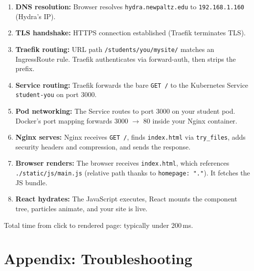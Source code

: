 \documentclass[11pt, letterpaper]{article}
\begin{document}
\begin{enumerate}
  \item \textbf{DNS resolution:} Browser resolves \texttt{hydra.newpaltz.edu}
        to \texttt{192.168.1.160} (Hydra's IP).
  \item \textbf{TLS handshake:} HTTPS connection established (Traefik
        terminates TLS).
  \item \textbf{Traefik routing:} URL path
        \texttt{/students/you/mysite/} matches an IngressRoute rule.
        Traefik authenticates via forward-auth, then strips the prefix.
  \item \textbf{Service routing:} Traefik forwards the bare \texttt{GET /}
        to the Kubernetes Service \texttt{student-you} on port 3000.
  \item \textbf{Pod networking:} The Service routes to port 3000 on your
        student pod. Docker's port mapping forwards 3000 $\to$ 80 inside
        your Nginx container.
  \item \textbf{Nginx serves:} Nginx receives \texttt{GET /}, finds
        \texttt{index.html} via \texttt{try\_files}, adds security headers
        and compression, and sends the response.
  \item \textbf{Browser renders:} The browser receives \texttt{index.html},
        which references \texttt{./static/js/main.js} (relative path thanks
        to \texttt{homepage: "."}). It fetches the JS bundle.
  \item \textbf{React hydrates:} The JavaScript executes, React mounts the
        component tree, particles animate, and your site is live.
\end{enumerate}

Total time from click to rendered page: typically under 200\,ms.

\section{Appendix: Troubleshooting}
\end{document}

